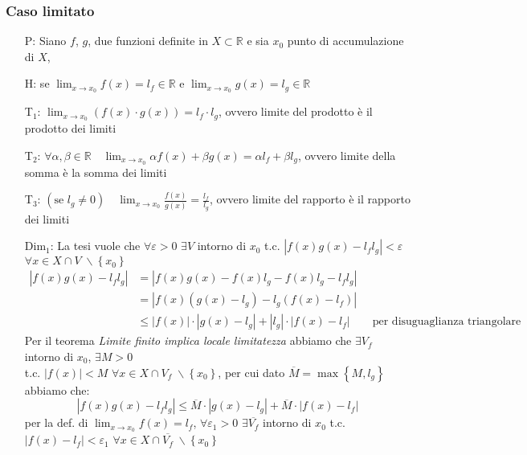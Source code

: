 \documentclass[a4paper]{article}
\begin{document}
\subsubsection*{Caso limitato}
\begin{itemize}
	\item[P:] Siano \(f\), \(g\), due funzioni definite in \(X \subset \mathbb{R}\) e sia \(x_0\) punto di accumulazione di \(X\),
	\item[H:] se \(\displaystyle \lim_{x \to x_0} f(x) = l_f \in \mathbb{R}\) e \(\displaystyle \lim_{x \to x_0} g(x) = l_g \in \mathbb{R}\)
	\item[T\(_1\):] \(\displaystyle \lim_{x \to x_0} \left( f(x) \cdot g(x) \right) = l_f \cdot l_g\), ovvero limite del prodotto è il prodotto dei limiti
	\item[T\(_2\):] \(\forall \alpha, \beta \in \mathbb{R} \quad \displaystyle \lim_{x \to x_0} \alpha f(x) + \beta g(x) = \alpha l_f + \beta l_g\), ovvero limite della somma è la somma dei limiti
	\item[T\(_3\):] \(\left( \text{se } l_g \neq 0 \right) \quad \displaystyle \lim_{x \to x_0} \frac{f(x)}{g(x)} = \frac{l_f}{l_g}\), ovvero limite del rapporto è il rapporto dei limiti
	\item[Dim\(_1\):] La tesi vuole che \(\forall \varepsilon > 0\) \(\exists V\) intorno di \(x_0\) t.c. \(\left| f(x)g(x) - l_f l_g \right| < \varepsilon\) \(\forall x \in X \cap V \; \backslash \left\{ x_0 \right\}\)
	\begin{align*}
		\left| f(x) g(x) - l_f l_g \right| &= \left| f(x) g(x) -f(x) l_g - f(x) l_g - l_f l_g\right| \\
		&= \left| f(x) \left( g(x) - l_g \right) - l_g \left( f(x) - l_f \right) \right| \\
		& \leq \left| f(x) \right| \cdot \left| g(x) - l_g \right| + \left| l_g \right| \cdot \left| f(x) - l_f \right| \qquad \text{per disuguaglianza triangolare}
	\end{align*}
	Per il teorema \textit{Limite finito implica locale limitatezza} abbiamo che \(\exists V_f\) intorno di \(x_0\), \(\exists M > 0\) \\ 
	t.c. \(\left| f(x) \right| < M\) \(\forall x \in X \cap V_f \; \backslash \left\{ x_0 \right\}\), per cui dato \(\overline{M} = \max \left\{ M, l_g \right\}\) abbiamo che:
	\[\left| f(x) g(x) - l_f l_g \right| \leq \overline{M} \cdot \left| g(x) - l_g \right| + \overline{M} \cdot \left| f(x) - l_f \right|\]
	per la def. di \(\displaystyle \lim_{x \to x_0} f(x) = l_f\), \(\forall \varepsilon_1 > 0\) \(\exists \overline{V_f}\) intorno di \(x_0\) t.c. \(\left| f(x) - l_f \right| < \varepsilon_1\) \(\forall x \in X \cap \overline{V_f} \; \backslash \left\{ x_0 \right\}\) \\

\end{itemize}
\end{document}

